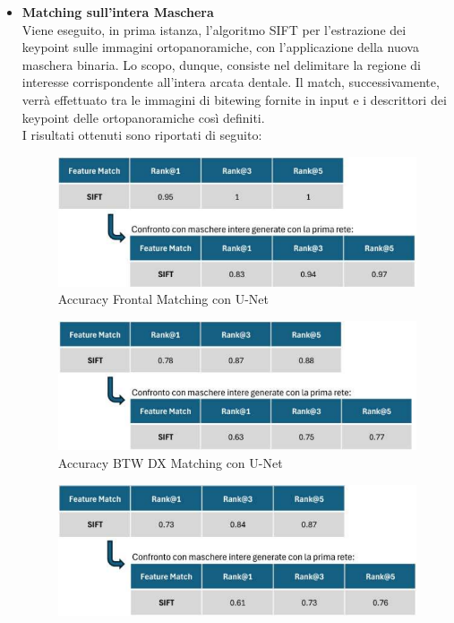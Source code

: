 \documentclass[12pt,a4paper,openright,twoside]{book}
\begin{document}
\begin{itemize}
\item \textbf{Matching sull'intera Maschera}\\
Viene eseguito, in prima istanza, l'algoritmo SIFT per l'estrazione dei keypoint sulle immagini ortopanoramiche, con l'applicazione della nuova maschera binaria. Lo scopo, dunque, consiste nel delimitare la regione di interesse corrispondente all'intera arcata dentale. Il match, successivamente, verrà effettuato tra le immagini di bitewing fornite in input e i descrittori dei keypoint delle ortopanoramiche così definiti.\\
I risultati ottenuti sono riportati di seguito:
\begin{figure}[H]
	\centering
	\includegraphics{figures/frontal4_1.pdf}
   	\caption{Accuracy Frontal Matching con U-Net}
	\label{fig:frontal4}
\end{figure}
\begin{figure}[H]
	\centering
	\includegraphics{figures/dx4_1.pdf}
    	\caption{Accuracy BTW DX Matching con U-Net}
	\label{fig:dx4}
\end{figure}
\begin{figure}[H]
	\centering
	\includegraphics{figures/sx4_1.pdf}

\end{figure}
\end{itemize}
\end{document}
